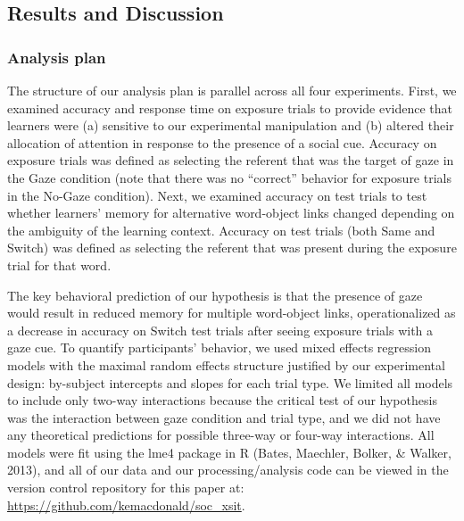 \documentclass[authoryear, review]{elsarticle}
\begin{document}
\subsection{Results and Discussion}\label{results-and-discussion}

\subsubsection{Analysis plan}\label{analysis-plan}

The structure of our analysis plan is parallel across all four
experiments. First, we examined accuracy and response time on exposure
trials to provide evidence that learners were (a) sensitive to our
experimental manipulation and (b) altered their allocation of attention
in response to the presence of a social cue. Accuracy on exposure trials
was defined as selecting the referent that was the target of gaze in the
Gaze condition (note that there was no ``correct'' behavior for exposure
trials in the No-Gaze condition). Next, we examined accuracy on test
trials to test whether learners' memory for alternative word-object
links changed depending on the ambiguity of the learning context.
Accuracy on test trials (both Same and Switch) was defined as selecting
the referent that was present during the exposure trial for that word.

The key behavioral prediction of our hypothesis is that the presence of
gaze would result in reduced memory for multiple word-object links,
operationalized as a decrease in accuracy on Switch test trials after
seeing exposure trials with a gaze cue. To quantify participants'
behavior, we used mixed effects regression models with the maximal
random effects structure justified by our experimental design:
by-subject intercepts and slopes for each trial type. We limited all
models to include only two-way interactions because the critical test of
our hypothesis was the interaction between gaze condition and trial
type, and we did not have any theoretical predictions for possible
three-way or four-way interactions. All models were fit using the lme4
package in R (Bates, Maechler, Bolker, \& Walker, 2013), and all of our
data and our processing/analysis code can be viewed in the version
control repository for this paper at:
\url{https://github.com/kemacdonald/soc_xsit}.
\end{document}
